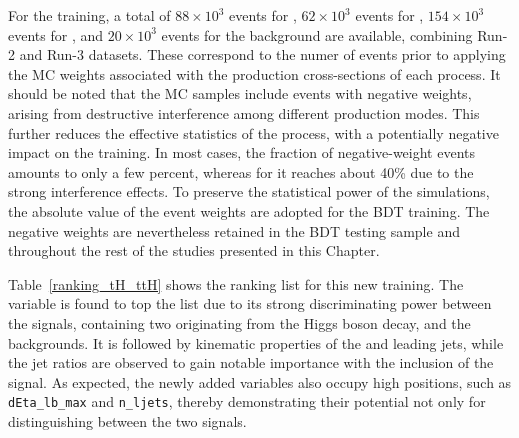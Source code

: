 For the training, a total of $88\times10^{3}$ events for \ttH, $62\times10^{3}$  events for \thqb, $154\times10^{3}$  events for \ztautau, and $20\times10^{3}$  events for the \ttbar background are available, combining Run-2 and Run-3 datasets. These correspond to the numer of events prior to applying the MC weights associated with the production cross-sections of each process. It should be noted that the MC samples include events with negative weights, arising from destructive interference among different production modes. This further reduces the effective statistics of the process, with a potentially negative impact on the training. In most cases, the fraction of negative-weight events amounts to only a few percent, whereas for \thqb it reaches about 40\% due to the strong interference effects. To preserve the statistical power of the \thqb simulations, the absolute value of the event weights are adopted for the BDT training. The negative weights are nevertheless retained in the BDT testing sample and throughout the rest of the studies presented in this Chapter.

Table~\ref{ranking_tH_ttH} shows the ranking list for this new training. The \mmc variable is found to top the list due to its strong discriminating power between the signals, containing two \tauhad originating from the Higgs boson decay, and the backgrounds. 
It is followed by kinematic properties of the \tauhad and leading jets, while the jet \pt ratios are observed to gain notable importance with the inclusion of the \thtt signal. As expected, the newly added variables also occupy high positions, such as \texttt{dEta\_lb\_max} and \texttt{n\_ljets}, thereby demonstrating their potential not only for distinguishing between the two signals.

